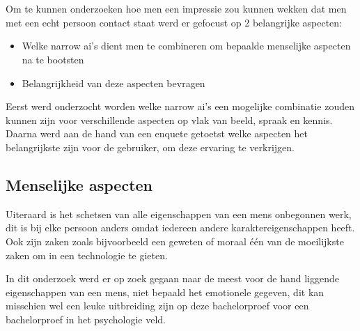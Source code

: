 
\chapter{}
\label{ch:methodologie}


Om te kunnen onderzoeken hoe men een impressie zou kunnen wekken dat men met een echt persoon contact staat werd er gefocust op 2 belangrijke aspecten:

\begin{itemize}
    \item Welke narrow ai's dient men te combineren om bepaalde menselijke aspecten na te bootsten
    \item Belangrijkheid van deze aspecten bevragen
\end{itemize}

Eerst werd onderzocht worden welke narrow ai's een mogelijke combinatie zouden kunnen zijn voor verschillende aspecten op vlak van beeld, spraak en kennis. Daarna werd aan de hand van een enquete getoetst welke aspecten het belangrijkste zijn voor de gebruiker, om deze ervaring te verkrijgen.

\newpage

\section{Menselijke aspecten}

Uiteraard is het schetsen van alle eigenschappen van een mens onbegonnen werk, dit is bij elke persoon anders omdat iedereen andere karaktereigenschappen heeft. Ook zijn zaken zoals bijvoorbeeld een geweten of moraal één van de moeilijkste zaken om in een technologie te gieten. 

In dit onderzoek werd er op zoek gegaan naar de meest voor de hand liggende eigenschappen van een mens, niet bepaald het emotionele gegeven, dit kan misschien wel een leuke uitbreiding zijn op deze bachelorproef voor een bachelorproef in het psychologie veld.

